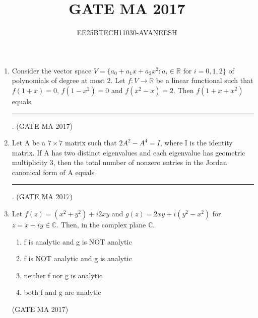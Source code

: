 \documentclass[journal,12pt,onecolumn]{IEEEtran}
\title{GATE MA 2017}
\author{EE25BTECH11030-AVANEESH}
\theoremstyle{remark}
\begin{document}
\maketitle
\begin{enumerate}

\item
Consider the vector space $V = \{a_0 + a_1x + a_2x^2 : a_i \in \mathbb{R} \text{ for } i=0,1,2\}$ of polynomials of degree at most 2. Let $f: V \to \mathbb{R}$ be a linear functional such that $f(1+x)=0$, $f(1-x^2)=0$ and $f(x^2-x)=2$. Then $f(1+x+x^2)$ equals \rule{1.5cm}{0.4pt}.
\hfill (GATE MA 2017)

\item
Let A be a $7 \times 7$ matrix such that $2A^2 - A^4 = I$, where I is the identity matrix. If A has two distinct eigenvalues and each eigenvalue has geometric multiplicity 3, then the total number of nonzero entries in the Jordan canonical form of A equals \rule{1.5cm}{0.4pt}.
\hfill (GATE MA 2017)

\item
Let $f(z) = (x^2+y^2) + i2xy$ and $g(z) = 2xy + i(y^2-x^2)$ for $z=x+iy \in \mathbb{C}$. Then, in the complex plane $\mathbb{C}$.
\begin{enumerate}
\item f is analytic and g is NOT analytic
\item f is NOT analytic and g is analytic
\item neither f nor g is analytic
\item both f and g are analytic
\end{enumerate}
\hfill (GATE MA 2017)


\end{enumerate}
\end{document}
